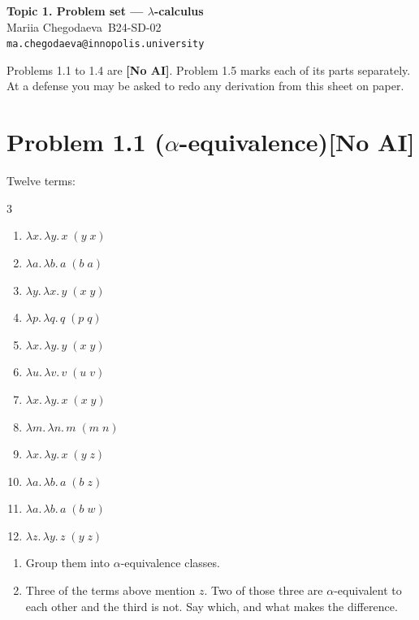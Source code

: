 \documentclass[11pt]{article}
\makeatletter
\newcommand{\noai}{\textcolor{BrickRed}{\textbf{[No AI]}}}
\newcommand{\studentname}{Mariia Chegodaeva}
\newcommand{\studentgroup}{B24-SD-02}
\newcommand{\studentemail}{ma.chegodaeva@innopolis.university}
\makeatother
\begin{document}
\begin{center}
  {\Large\bfseries Topic 1. Problem set --- $\lambda$-calculus}\\[0.5em]
  {\large\color{solution}\studentname\ \quad \studentgroup}\\[0.2em]
  {\small\color{solution}\texttt{\studentemail}}
\end{center}

\medskip
\noindent
Problems 1.1 to 1.4 are \noai. Problem 1.5 marks each of its parts separately.
At a
defense you may be asked to redo any derivation from this sheet on paper.

\bigskip

\section*{Problem 1.1 ($\alpha$-equivalence)\quad\normalsize\noai}

Twelve terms:

\begin{multicols}{3}
\begin{enumerate}\itemsep1pt
  \item $\lambda x.\, \lambda y.\, x\;(y\;x)$
  \item $\lambda a.\, \lambda b.\, a\;(b\;a)$
  \item $\lambda y.\, \lambda x.\, y\;(x\;y)$
  \item $\lambda p.\, \lambda q.\, q\;(p\;q)$
  \item $\lambda x.\, \lambda y.\, y\;(x\;y)$
  \item $\lambda u.\, \lambda v.\, v\;(u\;v)$
  \item $\lambda x.\, \lambda y.\, x\;(x\;y)$
  \item $\lambda m.\, \lambda n.\, m\;(m\;n)$
  \item $\lambda x.\, \lambda y.\, x\;(y\;z)$
  \item $\lambda a.\, \lambda b.\, a\;(b\;z)$
  \item $\lambda a.\, \lambda b.\, a\;(b\;w)$
  \item $\lambda z.\, \lambda y.\, z\;(y\;z)$
\end{enumerate}
\end{multicols}

\begin{enumerate}[label=(\alph*)]
  \item Group them into $\alpha$-equivalence classes.
  \item Three of the terms above mention $z$. Two of those three are
    $\alpha$-equivalent to each other and the third is not. Say which, and what
    makes the difference.
\end{enumerate}
\end{document}
